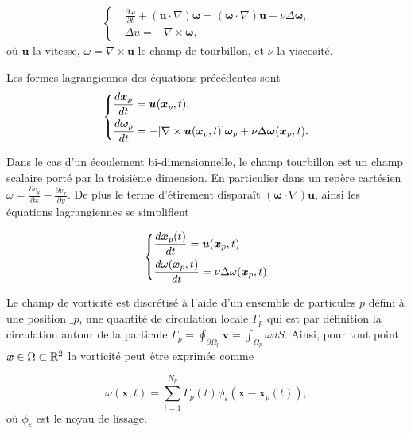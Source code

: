 \begin{gather*}
    \left\{\begin{aligned}
         & \frac{\partial \bm \omega}{\partial t} + (\bm{u} \cdot \nabla) \bm \omega  =  (\bm \omega \cdot \nabla) \bm u + \nu \Delta \bm \omega, \\
         & \Delta u   =  -\nabla \times \bm \omega,
    \end{aligned} \right.
\end{gather*}où $\bm{u}$ la vitesse, $\omega= \nabla \times \bm u$ le champ de tourbillon, et $\nu$ la viscosité.

Les formes lagrangiennes des équations précédentes sont
\begin{gather*}
    \left\{\begin{aligned}
         & \frac{d \bm{x}_p}{dt} = \bm u(\bm{x}_p, t),                                                                        \\
         & \frac{d\bm \omega_p}{dt} = - [\nabla \times \bm u (\bm{x}_p, t)]\bm \omega_p + \nu \Delta \bm \omega(\bm{x}_p, t).
    \end{aligned} \right.
\end{gather*}

Dans le cas d'un écoulement bi-dimensionnelle, le champ tourbillon est un champ scalaire porté par la troisième dimension. En particulier dans un repère cartésien $\omega = \frac{\partial v_y}{\partial x} - \frac{\partial v_x}{\partial y}$. De plus le terme d'étirement disparaît $(\bm \omega \cdot \nabla) \bm u$, ainsi les équations lagrangiennes se simplifient

\begin{gather*}
    \left\{\begin{aligned}
         & \frac{d \bm{x}_p(t)}{dt} = \bm u(\bm{x}_p, t)                    \\
         & \frac{d\omega(\bm{x}_p, t)}{dt} = \nu \Delta \omega(\bm{x}_p, t)
    \end{aligned} \right.
\end{gather*}

Le champ de vorticité est discrétisé à l'aide d'un ensemble de particules $p$ défini à une position $\bm _p$, une quantité de circulation locale $\Gamma_p$ qui est par définition la circulation autour de la particule $\Gamma_p = \oint_{\partial \Omega_p} \bm v = \int_{\Omega_p} \omega dS$. Ainsi, pour tout point $\bm{x} \in \Omega \subset \mathbb R^2$ la vorticité peut être exprimée comme

\begin{equation*}
    \omega(\bm x, t) = \sum_{i=1}^{N_p} \Gamma_p(t) \phi_\varepsilon(\bm x - \bm x_p(t)),
\end{equation*}où $\phi_\varepsilon$ est le noyau de lissage.

